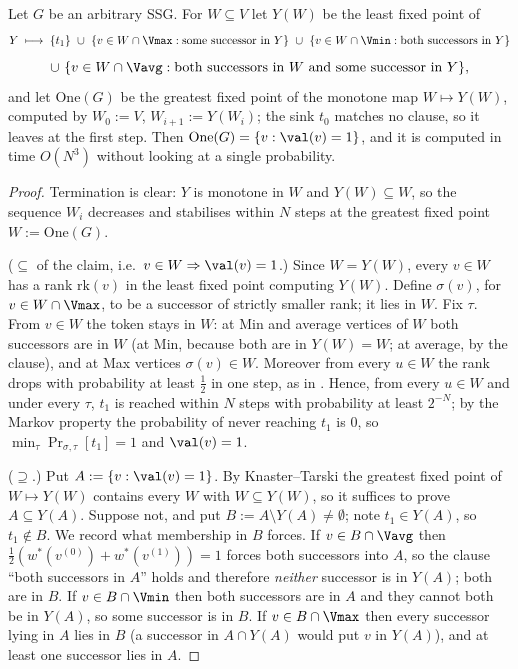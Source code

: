 \begin{theorem}\label{thm:fs16-assure}
Let $G$ be an arbitrary SSG. For $W\subseteq V$ let $Y(W)$ be the least fixed
point of
\[
  Y\;\longmapsto\;\{t_1\}\ \cup\
  \{v\in W\cap\Vmax: \text{some successor in }Y\}\ \cup\
  \{v\in W\cap\Vmin: \text{both successors in }Y\}
\]
\[
  \cup\ \{v\in W\cap\Vavg: \text{both successors in }W\ \text{and some successor in }Y\},
\]
and let $\mathrm{One}(G)$ be the greatest fixed point of the monotone map
$W\mapsto Y(W)$, computed by $W_0:=V$, $W_{i+1}:=Y(W_i)$; the sink $t_0$
matches no clause, so it leaves at the first step. Then
$\mathrm{One}(G)=\{v:\val(v)=1\}$, and it is computed in time $O(N^3)$ without
looking at a single probability.
\end{theorem}

\begin{proof}
Termination is clear: $Y$ is monotone in $W$ and $Y(W)\subseteq W$, so the
sequence $W_i$ decreases and stabilises within $N$ steps at the greatest fixed
point $W:=\mathrm{One}(G)$.

($\subseteq$ of the claim, i.e.\ $v\in W\Rightarrow\val(v)=1$.)
Since $W=Y(W)$, every $v\in W$ has a rank $\mathrm{rk}(v)$ in the least fixed
point computing $Y(W)$. Define $\sigma(v)$, for $v\in W\cap\Vmax$, to be a
successor of strictly smaller rank; it lies in $W$. Fix $\tau$. From $v\in W$
the token stays in $W$: at Min and average vertices of $W$ both successors are
in $W$ (at Min, because both are in $Y(W)=W$; at average, by the clause), and
at Max vertices $\sigma(v)\in W$. Moreover from every $u\in W$ the rank drops
with probability at least $\tfrac12$ in one step, as in
\Cref{lem:fs16-positive}. Hence, from every $u\in W$ and under every $\tau$,
$t_1$ is reached within $N$ steps with probability at least $2^{-N}$; by the
Markov property the probability of never reaching $t_1$ is $0$, so
$\min_\tau\Pr_{\sigma,\tau}[t_1]=1$ and $\val(v)=1$.

($\supseteq$.) Put $A:=\{v:\val(v)=1\}$. By Knaster--Tarski the greatest fixed
point of $W\mapsto Y(W)$ contains every $W$ with $W\subseteq Y(W)$, so it
suffices to prove $A\subseteq Y(A)$. Suppose not, and put
$B:=A\setminus Y(A)\ne\emptyset$; note $t_1\in Y(A)$, so $t_1\notin B$. We
record what membership in $B$ forces. If $v\in B\cap\Vavg$ then
$\tfrac12(w^\ast(v^{(0)})+w^\ast(v^{(1)}))=1$ forces both successors into $A$,
so the clause ``both successors in $A$'' holds and therefore \emph{neither}
successor is in $Y(A)$; both are in $B$. If $v\in B\cap\Vmin$ then both
successors are in $A$ and they cannot both be in $Y(A)$, so some successor is
in $B$. If $v\in B\cap\Vmax$ then every successor lying in $A$ lies in $B$ (a
successor in $A\cap Y(A)$ would put $v$ in $Y(A)$), and at least one successor
lies in $A$.


\end{proof}
